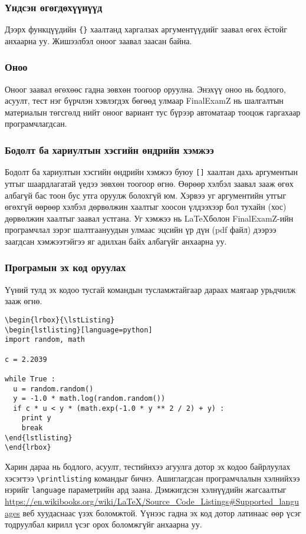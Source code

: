 \documentclass[10pt]{article}
\theoremstyle{definition}
\begin{document}
\subsubsection{Үндсэн өгөгдөхүүнүүд} Дээрх функцүүдийн \texttt{\{\}} хаалтанд харгалзах аргументүүдийг заавал өгөх ёстойг анхаарна уу. Жишээлбэл оноог заавал заасан байна. 

\subsubsection{Оноо} Оноог заавал өгөхөөс гадна зөвхөн тоогоор оруулна. Энэхүү оноо нь бодлого, асуулт, тест нэг бүрчлэн хэвлэгдэх бөгөөд улмаар FinalExamZ нь шалгалтын материалын төгсгөлд нийт оноог вариант тус бүрээр автоматаар тооцож гаргахаар програмчлагдсан.

\subsubsection{Бодолт ба хариултын хэсгийн өндрийн хэмжээ} Бодолт ба хариултын хэсгийн өндрийн хэмжээ буюу \texttt{[]} хаалтан дахь аргументын утгыг шаардлагатай үедээ зөвхөн тоогоор өгнө. Өөрөөр хэлбэл заавал зааж өгөх албагүй бас тоон бус утга оруулж болохгүй юм. Хэрвээ уг аргументийн утгыг өгөхгүй өөрөөр хэлбэл дөрвөлжин хаалтыг хоосон үлдээхээр бол тухайн (хос) дөрвөлжин хаалтыг заавал устгана. Уг хэмжээ нь \LaTeX болон FinalExamZ-ийн програмчлал зэрэг шалтгаануудын улмаас эцсийн үр дүн (pdf файл) дээрээ заагдсан хэмжээтэйгээ яг адилхан байх албагүйг анхаарна уу.

\subsubsection{Програмын эх код оруулах} Үүний тулд эх кодоо тусгай командын тусламжтайгаар дараах маягаар урьдчилж зааж өгнө.
\begin{verbatim}
\begin{lrbox}{\lstListing}
\begin{lstlisting}[language=python]
import random, math

c = 2.2039

while True :
  u = random.random()
  y = -1.0 * math.log(random.random())
  if c * u < y * (math.exp(-1.0 * y ** 2 / 2) + y) :
    print y
    break
\end{lstlisting}
\end{lrbox}
\end{verbatim}
Харин дараа нь бодлого, асуулт, тестийнхээ агуулга дотор эх кодоо байрлуулах хэсэгтээ \verb|\printlisting| командыг бичнэ. Ашиглагдсан програмчлалын хэлнийхээ нэрийг \texttt{language} параметрийн ард заана. Дэмжигдсэн хэлнүүдийн жагсаалтыг \url{https://en.wikibooks.org/wiki/LaTeX/Source_Code_Listings#Supported_languages} веб хуудаснаас үзэх боломжтой. Үүнээс гадна эх код дотор латинаас өөр үсэг тодруулбал кирилл үсэг орох боломжгүйг анхаарна уу.
\end{document}
